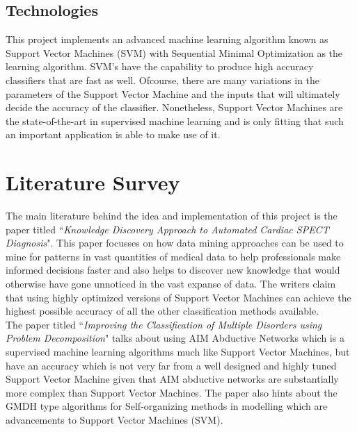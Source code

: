 \documentclass[11pt,a4paper]{report}
\begin{document}
{\section{Technologies}

This project implements an advanced machine learning algorithm known as Support Vector Machines (SVM) with Sequential Minimal Optimization as the learning algorithm. SVM's have the capability to produce high accuracy classifiers that are fast as well. Ofcourse, there are many variations in the parameters of the Support Vector Machine and the inputs that will ultimately decide the accuracy of the classifier. Nonetheless, Support Vector Machines are the state-of-the-art in supervised machine learning and is only fitting that such an important application is able to make use of it.\\ 





\chapter{Literature Survey}

\setlength{\parindent}{1cm}

The main literature behind the idea and implementation of this project is the paper titled ``\emph{Knowledge Discovery Approach to Automated Cardiac SPECT Diagnosis}"\cite{KD}. This paper focusses on how data mining approaches can be used to mine for patterns in vast quantities of medical data to help professionals make informed decisions faster and also helps to discover new knowledge that would otherwise have gone unnoticed in the vast expanse of data. The writers claim that using highly optimized versions of Support Vector Machines can achieve the highest possible accuracy of all the other classification methods available.\\

The paper titled ``\emph{Improving the Classification of Multiple Disorders using Problem Decomposition}"\cite{CM} talks about using AIM Abductive Networks which is a supervised machine learning algorithms much like Support Vector Machines, but have an accuracy which is not very far from a well designed and highly tuned Support Vector Machine given that AIM abductive networks are substantially more complex than Support Vector Machines. The paper also hints about the GMDH type algorithms for Self-organizing methods in modelling which are advancements to Support Vector Machines (SVM).\\

}
\end{document}
